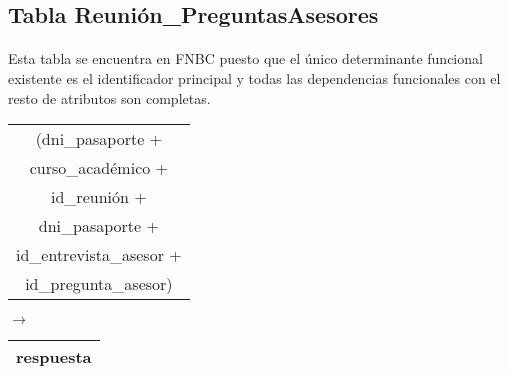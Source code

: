 \subsection{Tabla Reunión\_PreguntasAsesores}

  \paragraph{}Esta tabla se encuentra en FNBC puesto que el único determinante
  funcional existente es el identificador principal y todas las dependencias
  funcionales con el resto de atributos son completas.

  \begin{center}
    \begin{minipage}{4.4cm}{\begin{flushright}\begin{tabular}{ | c | }
                  \hline
                  (dni\_pasaporte + \\
                  curso\_académico + \\
                  id\_reunión + \\
                  dni\_pasaporte + \\
                  id\_entrevista\_asesor + \\
                  id\_pregunta\_asesor) \\
                  \hline
                 \end{tabular}\end{flushright} }
    \end{minipage}
    \begin{minipage}{0.7cm}{$\longrightarrow$}
    \end{minipage}
    \begin{minipage}{5.9cm}{\begin{tabular}{ | c | }
                  \hline
                  respuesta \\
                  \hline
                 \end{tabular} }
    \end{minipage}
  \end{center}
